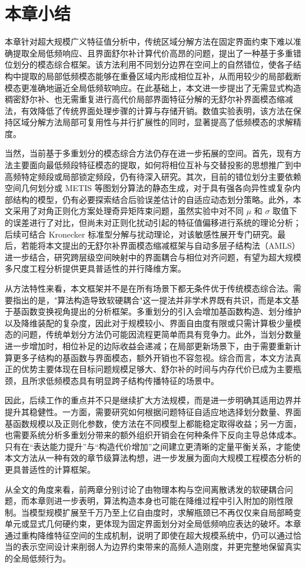 
\section{本章小结}
本章针对超大规模广义特征值分析中，传统区域分解方法在固定界面约束下难以准确提取全局低频响应、且界面舒尔补计算代价高昂的问题，提出了一种基于多重错位划分的模态综合框架。该方法利用不同划分边界在空间上的自然错位，使各子结构中提取的局部低频模态能够在重叠区域内形成相位互补，从而用较少的局部截断模态更准确地逼近全局低频软响应。在此基础上，本文进一步提出了无需显式构造稠密舒尔补、也无需重复进行高代价局部界面特征分解的无舒尔补界面模态缩减法，有效降低了传统界面处理步骤的计算与存储开销。数值实验表明，该方法在保持区域分解方法局部可复用性与并行扩展性的同时，显著提高了低频模态的求解精度。


当然，当前基于多重划分的模态综合方法仍存在进一步拓展的空间。首先，现有方法主要面向最低频段特征模态的提取，如何将相位互补与交替投影的思想推广到中高频特定频段或局部锁定频段，仍有待深入研究。其次，目前的错位划分主要依赖空间几何划分或 METIS 等图划分算法的静态生成，对于具有强各向异性或复杂内部结构的模型，仍有必要探索结合后验误差估计的自适应动态划分策略。此外，本文采用了对角正则化方案处理奇异矩阵束问题，虽然实验中对不同 $\mu$ 和 $\sigma$ 取值下的误差进行了对比，但尚未对正则化扰动引起的特征值偏移进行系统的理论分析；后续可结合 Kronecker 标准型分解与扰动理论，对该敏感性展开专门研究。最后，若能将本文提出的无舒尔补界面模态缩减框架与自动多层子结构法（AMLS）进一步结合，研究跨层级空间映射中的界面耦合与相位对齐问题，有望为超大规模多尺度工程分析提供更具普适性的并行降维方案。

从方法特性来看，本文框架并不是在所有场景下都无条件优于传统模态综合法。需要指出的是，"算法构造导致软硬耦合"这一提法并非学术界既有共识，而是本文基于基函数变换视角提出的分析框架。多重划分的引入会增加基函数构造、划分维护以及降维装配的复杂度，因此对于规模较小、界面自由度有限或只需计算极少量模态的问题，传统单划分方法仍可能因流程更简单而具有竞争力。此外，当划分数量进一步增加时，相位补足的边际收益会递减；在局部更新场景下，由于需要重新计算更多子结构的基函数与界面模态，额外开销也不容忽视。综合而言，本文方法真正的优势主要体现在目标问题规模足够大、舒尔补的时间与内存代价已成为主要瓶颈，且所求低频模态具有明显跨子结构传播特征的场景中。

因此，后续工作的重点并不只是继续扩大方法规模，而是进一步明确其适用边界并提升其稳健性。一方面，需要研究如何根据问题特征自适应地选择划分数量、界面基函数规模以及正则化参数，使方法在不同模型上都能稳定取得收益；另一方面，也需要系统分析多重划分带来的额外组织开销会在何种条件下反向主导总体成本。只有在“表达能力提升”与“构造代价增加”之间建立更清晰的定量平衡关系，才能使本文方法从一种有效的章节级算法构想，进一步发展为面向大规模工程模态分析的更具普适性的计算框架。

从全文的角度来看，前两章分别讨论了由物理本构与空间离散诱发的软硬耦合问题，而本章则进一步表明，算法构造本身也可能在降维过程中引入附加的刚性限制。当模型规模扩展至千万乃至上亿自由度时，求解瓶颈已不再仅仅来自局部畸变单元或显式几何硬约束，更体现为固定界面划分对全局低频响应表达的破坏。本章通过重构降维特征空间的生成机制，说明了即使在超大规模系统中，仍可以通过恰当的表示空间设计来削弱人为边界约束带来的高频人造刚度，并更完整地保留真实的全局低频行为。
